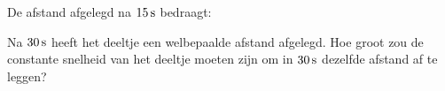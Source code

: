 \documentclass{ximera}
\begin{document}
\begin{exercise} 


\end{exercise}

\begin{exercise} 
\end{exercise}

\begin{exercise} De afstand afgelegd na $15\rm\,s$ bedraagt:
\end{exercise}

\begin{exercise} Na $30\rm\,s$ heeft het deeltje een welbepaalde afstand afgelegd. Hoe groot zou de constante snelheid van het deeltje moeten zijn om in $30\rm\,s$ dezelfde afstand af te leggen?
\end{exercise}
\end{document}
